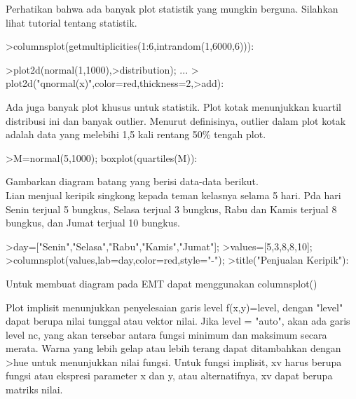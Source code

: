 \documentclass[a4paper,10pt]{article}
\begin{document}
\begin{eulernotebook}
\begin{eulercomment}
\begin{eulercomment}
\begin{eulercomment}
\begin{eulercomment}
\begin{eulercomment}
\begin{eulercomment}
\begin{eulerprompt}
\end{eulerprompt}
\begin{eulercomment}
Perhatikan bahwa ada banyak plot statistik yang mungkin berguna.
Silahkan lihat tutorial tentang statistik.
\end{eulercomment}
\begin{eulerprompt}
>columnsplot(getmultiplicities(1:6,intrandom(1,6000,6))):
\end{eulerprompt}
\begin{eulerprompt}
>plot2d(normal(1,1000),>distribution); ...
>  plot2d("qnormal(x)",color=red,thickness=2,>add):
\end{eulerprompt}
\begin{eulercomment}
Ada juga banyak plot khusus untuk statistik. Plot kotak menunjukkan
kuartil distribusi ini dan banyak outlier. Menurut definisinya,
outlier dalam plot kotak adalah data yang melebihi 1,5 kali rentang
50\% tengah plot.
\end{eulercomment}
\begin{eulerprompt}
>M=normal(5,1000); boxplot(quartiles(M)):
\end{eulerprompt}
\begin{eulercomment}
Gambarkan diagram batang yang berisi data-data berikut.\\
Lian menjual keripik singkong kepada teman kelasnya selama 5 hari. Pda
hari Senin terjual 5 bungkus, Selasa terjual 3 bungkus, Rabu dan Kamis
terjual 8 bungkus, dan Jumat terjual 10 bungkus. 
\end{eulercomment}
\begin{eulerprompt}
>day=["Senin","Selasa","Rabu","Kamis","Jumat"];
>values=[5,3,8,8,10];
>columnsplot(values,lab=day,color=red,style="-");
>title("Penjualan Keripik"):
\end{eulerprompt}
\begin{eulercomment}
Untuk membuat diagram pada EMT dapat menggunakan columnsplot()
\end{eulercomment}
\begin{eulercomment}
Plot implisit menunjukkan penyelesaian garis level f(x,y)=level,
dengan "level" dapat berupa nilai tunggal atau vektor nilai. Jika
level = "auto", akan ada garis level nc, yang akan tersebar antara
fungsi minimum dan maksimum secara merata. Warna yang lebih gelap atau
lebih terang dapat ditambahkan dengan \textgreater{}hue untuk menunjukkan nilai
fungsi. Untuk fungsi implisit, xv harus berupa fungsi atau ekspresi
parameter x dan y, atau alternatifnya, xv dapat berupa matriks nilai.


\end{eulercomment}
\end{eulercomment}
\end{eulercomment}
\end{eulercomment}
\end{eulercomment}
\end{eulercomment}
\end{eulercomment}
\end{eulernotebook}
\end{document}
